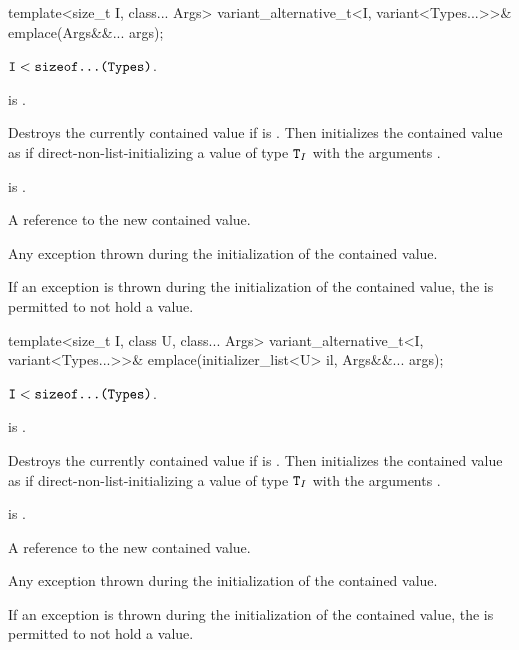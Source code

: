 %
\begin{itemdecl}
template<size_t I, class... Args>
  variant_alternative_t<I, variant<Types...>>& emplace(Args&&... args);
\end{itemdecl}

\begin{itemdescr}  %
\pnum
\mandates
$\texttt{I} < \texttt{sizeof...(Types)}$.

\pnum
\constraints
{} is .

\pnum
\effects
Destroys the currently contained value if 
is .
Then initializes the contained value as if direct-non-list-initializing
a value of type $\texttt{T}_I$
with the arguments .

\pnum
\ensures
{} is .

\pnum
\returns
A reference to the new contained value.

\pnum
\throws
Any exception thrown during the initialization of the contained value.

\pnum
\remarks
If an exception is thrown during the initialization of the contained value,
the  is permitted to not hold a value.
\end{itemdescr}

%
\begin{itemdecl}
template<size_t I, class U, class... Args>
  variant_alternative_t<I, variant<Types...>>& emplace(initializer_list<U> il, Args&&... args);
\end{itemdecl}

\begin{itemdescr}  %
\pnum
\mandates
$\texttt{I} < \texttt{sizeof...(Types)}$.

\pnum
\constraints
{} is .

\pnum
\effects
Destroys the currently contained value if 
is .
Then initializes the contained value as if direct-non-list-initializing
a value of type $\texttt{T}_I$
with the arguments .

\pnum
\ensures
{} is .

\pnum
\returns
A reference to the new contained value.

\pnum
\throws
Any exception thrown during the initialization of the contained value.

\pnum
\remarks
If an exception is thrown during the initialization of the contained value,
the  is permitted to not hold a value.
\end{itemdescr}

